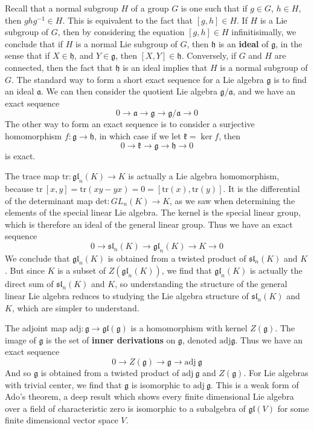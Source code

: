 Recall that a normal subgroup $H$ of a group $G$ is one such that if $g \in G$, $h \in H$, then $ghg^{-1} \in H$. This is equivalent to the fact that $[g,h] \in H$. If $H$ is a Lie subgroup of $G$, then by considering the equation $[g,h] \in H$ infinitisimally, we conclude that if $H$ is a normal Lie subgroup of $G$, then $\mathfrak{h}$ is an {\bf ideal} of $\mathfrak{g}$, in the sense that if $X \in \mathfrak{h}$, and $Y \in \mathfrak{g}$, then $[X,Y] \in \mathfrak{h}$. Conversely, if $G$ and $H$ are connected, then the fact that $\mathfrak{h}$ is an ideal implies that $H$ is a normal subgroup of $G$. The standard way to form a short exact sequence for a Lie algebra $\mathfrak{g}$ is to find an ideal $\mathfrak{a}$. We can then consider the quotient Lie algebra $\mathfrak{g}/\mathfrak{a}$, and we have an exact sequence
%
\[ 0 \to \mathfrak{a} \to \mathfrak{g} \to \mathfrak{g}/\mathfrak{a} \to 0 \]
%
The other way to form an exact sequence is to consider a surjective homomorphism $f: \mathfrak{g} \to \mathfrak{h}$, in which case if we let $\mathfrak{k} = \ker f$, then
%
\[ 0 \to \mathfrak{k} \to \mathfrak{g} \to \mathfrak{h} \to 0 \]
%
is exact.

\begin{example}
    The trace map $\text{tr}: \mathfrak{gl}_n(K) \to K$ is actually a Lie algebra homomorphism, because $\text{tr}\ [x,y] = \text{tr}(xy - yx) = 0 = [\text{tr}(x), \text{tr}(y)]$. It is the differential of the determinant map $\text{det}: GL_n(K) \to K$, as we saw when determining the elements of the special linear Lie algebra. The kernel is the special linear group, which is therefore an ideal of the general linear group. Thus we have an exact sequence
    \[ 0 \to \mathfrak{sl}_n(K) \to \mathfrak{gl}_n(K) \to K \to 0 \]
    We conclude that $\mathfrak{gl}_n(K)$ is obtained from a twisted product of $\mathfrak{sl}_n(K)$ and $K$. But since $K$ is a subset of $Z(\mathfrak{gl}_n(K))$, we find that $\mathfrak{gl}_n(K)$ is actually the direct sum of $\mathfrak{sl}_n(K)$ and $K$, so understanding the structure of the general linear Lie algebra reduces to studying the Lie algebra structure of $\mathfrak{sl}_n(K)$ and $K$, which are simpler to understand.
\end{example}

\begin{example}
    The adjoint map $\text{adj}: \mathfrak{g} \to \mathfrak{gl}(\mathfrak{g})$ is a homomorphism with kernel $Z(\mathfrak{g})$. The image of $\mathfrak{g}$ is the set of {\bf inner derivations} on $\mathfrak{g}$, denoted $\text{adj} \mathfrak{g}$. Thus we have an exact sequence
    \[ 0 \to Z(\mathfrak{g}) \to \mathfrak{g} \to \text{adj}\ \mathfrak{g} \]
    And so $\mathfrak{g}$ is obtained from a twisted product of $\text{adj}\ \mathfrak{g}$ and $Z(\mathfrak{g})$. For Lie algebras with trivial center, we find that $\mathfrak{g}$ is isomorphic to $\text{adj}\ \mathfrak{g}$. This is a weak form of Ado's theorem, a deep result which shows every finite dimensional Lie algebra over a field of characteristic zero is isomorphic to a subalgebra of $\mathfrak{gl}(V)$ for some finite dimensional vector space $V$.
\end{example}

